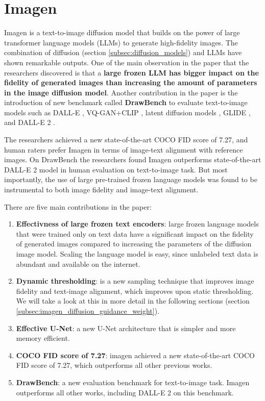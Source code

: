 \section{Imagen}

Imagen \cite{imagen} is a text-to-image diffusion model that builds on the power of large transformer language models \cite{transformer} (LLMs) to generate high-fidelity images. The combination of diffusion (section \ref{subsec:diffusion_models}) and LLMs have shown remarkable outputs. One of the main observation in the paper that the researchers discovered is that a \textbf{large frozen LLM has bigger impact on the fidelity of generated images than increasing the amount of parameters in the image diffusion model}. Another contribution in the paper is the introduction of new benchmark called \textbf{DrawBench} to evaluate text-to-image models such as DALL-E \cite{dalle}, VQ-GAN+CLIP \cite{vqgan_clip}, latent diffusion models \cite{stable_diffusion}, GLIDE \cite{glide}, and DALL-E 2 \cite{dalle_2}.

The researchers achieved a new state-of-the-art COCO FID score of 7.27, and human raters prefer Imagen in terms of image-text alignment with reference images. On DrawBench the researchers found Imagen outperforms state-of-the-art DALL-E 2 model in human evaluation on text-to-image task. But most importantly, the use of large pre-trained frozen language models was found to be instrumental to both image fidelity and image-text alignment.

There are five main contributions in the paper:

\begin{enumerate}
    \item \textbf{Effectivness of large frozen text encoders}: large frozen language models that were trained only on text data have a significant impact on the fidelity of generated images compared to increasing the parameters of the diffusion image model. Scaling the language model is easy, since unlabeled text data is abundant and available on the internet.
    \item \textbf{Dynamic thresholding}: is a new sampling technique that improves image fidelity and text-image alignment, which improves upon static thresholding. We will take a look at this in more detail in the following sections (section \ref{subsec:imagen_diffusion_guidance_weight}).
    \item \textbf{Effective U-Net}: a new U-Net architecture that is simpler and more memory efficient.
    \item \textbf{COCO FID score of 7.27}: imagen achieved a new state-of-the-art COCO FID score of 7.27, which outperforms all other previous works.
    \item \textbf{DrawBench}: a new evaluation benchmark for text-to-image task. Imagen outperforms all other works, including DALL-E 2 \cite{dalle_2} on this benchmark.
\end{enumerate}













